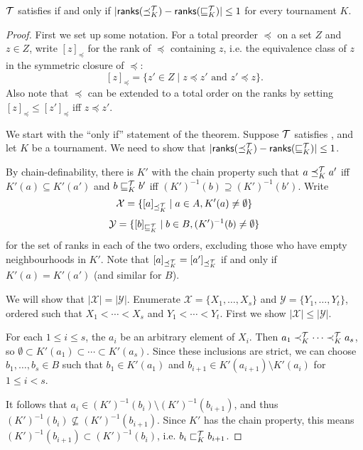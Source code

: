 \begin{theorem}
    \label{tourn_result_chain_def_ranks_characterisation}

    $\mathcal{T}$ satisfies \chaindef{} if and only if $|\mathsf{ranks}({\preceq_K^{\mathcal{T}}})
    - \mathsf{ranks}({\sqsubseteq_K^{\mathcal{T}}})| \le 1$ for every tournament $K$.
\end{theorem}

\begin{proof}

    First we set up some notation. For a total preorder $\preceq$ on a set $Z$
    and $z \in Z$, write $[z]_{\preceq}$ for the rank of ${\preceq}$ containing
    $z$, i.e. the equivalence class of $z$ in the symmetric closure of
    ${\preceq}$:
    \[
        [z]_{\preceq}
        = \{z' \in Z \mid z \preceq z' \text{ and } z' \preceq z\}.
    \]
    Also note that $\preceq$ can be extended to a total order on the ranks by
    setting $[z]_{\preceq} \le [z']_{\preceq}$ iff $z \preceq z'$.

    We start with the ``only if'' statement of the theorem. Suppose
    $\mathcal{T}$ satisfies \chaindef{}, and let $K$ be a tournament. We need
    to show that $|\mathsf{ranks}({\preceq_K^{\mathcal{T}}}) - \mathsf{ranks}({\sqsubseteq_K^{\mathcal{T}}})| \le 1$.

    By chain-definability, there is $K'$ with the chain property such that $a
    \preceq_K^{\mathcal{T}} a'$ iff $K'(a) \subseteq K'(a')$ and $b \sqsubseteq_K^{\mathcal{T}} b'$ iff
    $(K')^{-1}(b) \supseteq (K')^{-1}(b')$. Write
    \[ \mathcal{X} = \{ [a]_{\preceq_K^{\mathcal{T}}} \mid a \in A, K'(a) \ne \emptyset \} \]
    \[ \mathcal{Y} = \{ [b]_{\sqsubseteq_K^{\mathcal{T}}} \mid b \in B, (K')^{-1}(b) \ne \emptyset \} \]
    for the set of ranks in each of the two orders, excluding those who have
    empty neighbourhoods in $K'$. Note that $[a]_{\preceq_K^{\mathcal{T}}} =
    [a']_{\preceq_K^{\mathcal{T}}}$ if and only if $K'(a) = K'(a')$ (and similar for $B$).

    We will show that $|\mathcal{X}| = |\mathcal{Y}|$. Enumerate $\mathcal{X} =
    \{X_1,\ldots,X_s\}$ and $\mathcal{Y} = \{Y_1,\ldots,Y_t\}$, ordered such
    that $X_1 < \cdots < X_s$ and $Y_1 < \cdots < Y_t$. First we show
    $|\mathcal{X}| \le |\mathcal{Y}|$.

    For each $1 \le i \le s$, the $a_i$ be an arbitrary element of $X_i$. Then
    $a_1 \prec_K^{\mathcal{T}} \cdots \prec_K^{\mathcal{T}} a_s$, so $\emptyset \subset K'(a_1)
    \subset \cdots \subset K'(a_s)$. Since these inclusions are strict, we can
    choose $b_1,\ldots,b_s \in B$ such that $b_1 \in K'(a_1)$ and $b_{i+1} \in
    K'(a_{i+1}) \setminus K'(a_i)$ for $1 \le i < s$.

    It follows that $a_i \in (K')^{-1}(b_i) \setminus (K')^{-1}(b_{i+1})$, and
    thus $(K')^{-1}(b_i) \not\subseteq (K')^{-1}(b_{i+1})$. Since $K'$ has
    the chain property, this means $(K')^{-1}(b_{i+1}) \subset
    (K')^{-1}(b_i)$, i.e. $b_i \sqsubset_K^{\mathcal{T}} b_{i+1}$.


\end{proof}
